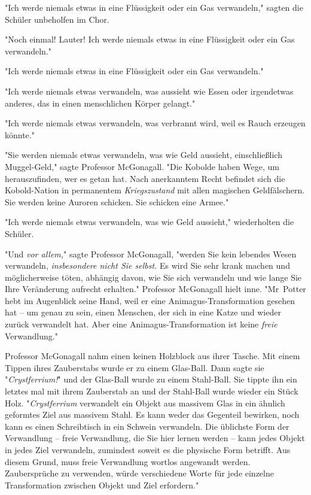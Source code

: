 {"Ich werde niemals etwas in eine Flüssigkeit oder ein Gas verwandeln," sagten die Schüler unbeholfen im Chor.

"Noch einmal! Lauter! Ich werde niemals etwas in eine Flüssigkeit oder ein Gas verwandeln."

"Ich werde niemals etwas in eine Flüssigkeit oder ein Gas verwandeln."

"Ich werde niemals etwas verwandeln, was aussieht wie Essen oder irgendetwas anderes, das in einen menschlichen Körper gelangt."

"Ich werde niemals etwas verwandeln, was verbrannt wird, weil es Rauch erzeugen könnte."

"Sie werden niemals etwas verwandeln, was wie Geld aussieht, einschließlich Muggel-Geld," sagte Professor McGonagall. "Die Kobolde haben Wege, um herauszufinden, wer es getan hat. Nach anerkanntem Recht befindet sich die Kobold-Nation in permanentem \emph{Kriegszustand} mit allen magischen Geldfälschern. Sie werden keine Auroren schicken. Sie schicken eine Armee."

"Ich werde niemals etwas verwandeln, was wie Geld aussieht," wiederholten die Schüler.

"Und \emph{vor allem,}" sagte Professor McGonagall, "werden Sie kein lebendes Wesen verwandeln, \emph{insbesondere nicht Sie selbst.} Es wird Sie sehr krank machen und möglicherweise töten, abhängig davon, wie Sie sich verwandeln und wie lange Sie Ihre Veränderung aufrecht erhalten." Professor McGonagall hielt inne. "Mr~Potter hebt im Augenblick seine Hand, weil er eine Animagus-Transformation gesehen hat -- um genau zu sein, einen Menschen, der sich in eine Katze und wieder zurück verwandelt hat. Aber eine Animagus-Transformation ist keine \emph{freie} Verwandlung."

Professor McGonagall nahm einen keinen Holzblock aus ihrer Tasche. Mit einem Tippen ihres Zauberstabs wurde er zu einem Glas-Ball. Dann sagte sie "\emph{Crystferrium!}" und der Glas-Ball wurde zu einem Stahl-Ball. Sie tippte ihn ein letztes mal mit ihrem Zauberstab an und der Stahl-Ball wurde wieder ein Stück Holz. "\emph{Crystferrium} verwandelt ein Objekt aus massivem Glas in ein ähnlich geformtes Ziel aus massivem Stahl. Es kann weder das Gegenteil bewirken, noch kann es einen Schreibtisch in ein Schwein verwandeln. Die üblichste Form der Verwandlung -- freie Verwandlung, die Sie hier lernen werden -- kann jedes Objekt in jedes Ziel verwandeln, zumindest soweit es die physische Form betrifft. Aus diesem Grund, muss freie Verwandlung wortlos angewandt werden. Zaubersprüche zu verwenden, würde verschiedene Worte für jede einzelne Transformation zwischen Objekt und Ziel erfordern."

}
